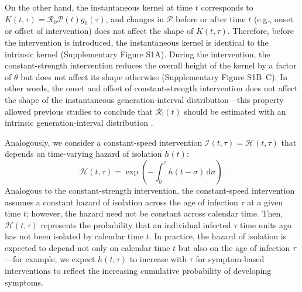 \documentclass[12pt]{article}
\newcommand{\Rx}[1]{\ensuremath{{\mathcal R}_{#1}}\xspace}
\newcommand{\Ro}{\Rx{0}}
\newcommand{\Ri}{\Rx{\mathrm{i}}}
\newcommand{\dd}[1]{\ensuremath{\, \mathrm{d}#1}}
\newcommand{\dsigma}{\dd{\sigma}}
\newcommand{\PP}{\ensuremath{\mathcal P}}
\newcommand{\II}{\ensuremath{\mathcal I}}
\newcommand{\HH}{\ensuremath{\mathcal H}}
\begin{document}
On the other hand, the instantaneous kernel at time $t$ corresponds to $K(t, \tau) = \Ro \PP(t) g_0(\tau)$, and changes in $\PP$ before or after time $t$ (e.g., onset or offset of intervention) does not affect the shape of $K(t, \tau)$.
Therefore, before the intervention is introduced, the instantaneous kernel is identical to the intrinsic kernel (Supplementary Figure S1A).
During the intervention, the constant-strength intervention reduces the overall height of the kernel by a factor of $\theta$ but does not affect its shape otherwise (Supplementary Figure S1B--C).
In other words, the onset and offset of constant-strength intervention does not affect the shape of the instantaneous generation-interval distribution---this property allowed previous studies to conclude that $\Ri(t)$ should be estimated with an intrinsic generation-interval distribution \citep{gostic2020practical}.

Analogously, we consider a constant-speed intervention $\II(t, \tau) = \HH(t, \tau)$ that depends on time-varying hazard of isolation $h(t)$:
\begin{equation}
\HH(t, \tau) = \exp \left(- \int_0^\tau h(t-\sigma) \dsigma \right).
\end{equation}
Analogous to the constant-strength intervention, the constant-speed intervention assumes a constant hazard of isolation across the age of infection $\tau$ at a given time $t$; however, the hazard need not be constant across calendar time.
Then, $\HH(t,\tau)$ represents the probability that an individual infected $\tau$ time units ago has not been isolated by calendar time $t$.
In practice, the hazard of isolation is expected to depend not only on calendar time $t$ but also on the age of infection $\tau$---for example, we expect $h(t, \tau)$ to increase with $\tau$ for symptom-based interventions to reflect the increasing cumulative probability of developing symptoms.
\end{document}
